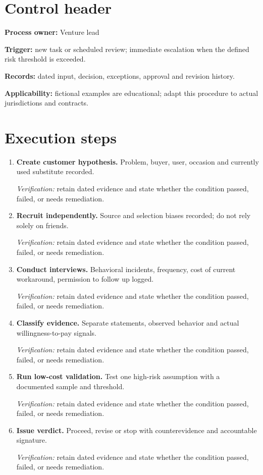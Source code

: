 \documentclass[11pt]{article}
\begin{document}
\SuiteOpen
\section{Control header}
\textbf{Process owner:} Venture lead\par\textbf{Trigger:} new task or scheduled review; immediate escalation when the defined risk threshold is exceeded.\par\textbf{Records:} dated input, decision, exceptions, approval and revision history.\par\textbf{Applicability:} fictional examples are educational; adapt this procedure to actual jurisdictions and contracts.
\section{Execution steps}
\begin{enumerate}[leftmargin=*,itemsep=8pt]
\item \textbf{Create customer hypothesis.} Problem, buyer, user, occasion and currently used substitute recorded.\par\textit{Verification:} retain dated evidence and state whether the condition passed, failed, or needs remediation.
\item \textbf{Recruit independently.} Source and selection biases recorded; do not rely solely on friends.\par\textit{Verification:} retain dated evidence and state whether the condition passed, failed, or needs remediation.
\item \textbf{Conduct interviews.} Behavioral incidents, frequency, cost of current workaround, permission to follow up logged.\par\textit{Verification:} retain dated evidence and state whether the condition passed, failed, or needs remediation.
\item \textbf{Classify evidence.} Separate statements, observed behavior and actual willingness-to-pay signals.\par\textit{Verification:} retain dated evidence and state whether the condition passed, failed, or needs remediation.
\item \textbf{Run low-cost validation.} Test one high-risk assumption with a documented sample and threshold.\par\textit{Verification:} retain dated evidence and state whether the condition passed, failed, or needs remediation.
\item \textbf{Issue verdict.} Proceed, revise or stop with counterevidence and accountable signature.\par\textit{Verification:} retain dated evidence and state whether the condition passed, failed, or needs remediation.
\end{enumerate}
\end{document}
